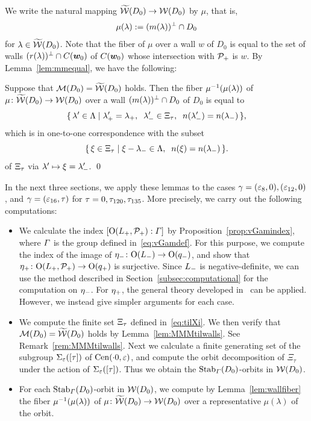 \documentclass{amsart} %
\begin{document}
%
We write the natural mapping
$\widetilde{\mathord{\mathcal{W}}}(D_0)\to \mathord{\mathcal{W}}(D_0)$
by $\mu$, that is, 
\[
\mu(\lambda):=(m(\lambda))^{\perp}\cap D_0
\]
for $\lambda\in \widetilde{\mathord{\mathcal{W}}}(D_0)$.
Note that the fiber of $\mu$ over a wall $w$
of $D_0$ is equal to the set of walls $(r(\lambda))^{\perp}\cap \mathord{C}(\boldsymbol{w}_0)$
of $\mathord{C}(\boldsymbol{w}_0)$ whose intersection with $\mathord{\mathcal{P}}_{+}$ is $w$.
By Lemma~\ref{lem:mmequal}, we have the following:
%
\begin{lemma}\label{lem:wallfiber}
Suppose that $\mathord{\mathcal{M}}(D_0)=\widetilde{\mathord{\mathcal{W}}} (D_0)$ holds.
Then the fiber $\mu^{-1}(\mu(\lambda))$ 
of 
$\mu\colon \widetilde{\mathord{\mathcal{W}}}(D_0)\to \mathord{\mathcal{W}}(D_0)$
over a wall $(m(\lambda))^{\perp}\cap D_0$ of $D_0$
is equal to
\[
\set{\lambda\sprime\in \Leech}%
{\lambdaplus\sprime=\lambdaplus, \;\; \lambdaminus\sprime\in \Xitau, \;\; n(\lambdaminus\sprime)=n(\lambdaminus)},
\]
which is in one-to-one correspondence with the subset 
\[
\{\,{\xi\in \Xi_{\tau}}\mid {\xi-{\lambda}_{-}\in \Lambda, \;\; n(\xi)=n({\lambda}_{-})} \,\}.
\]
of $\Xi_{\tau}$ via $\lambda^{\prime} \mapsto \xi={\lambda}_{-}^{\prime}$.
\qed
\end{lemma}
%
In the next three sections, we apply these lemmas to the cases $\gamma=(\varepsilon_8, 0), (\varepsilon_{12}, 0)$,
and $\gamma=(\varepsilon_{16}, \tau)$ for $\tau=0,\tau_{120},\tau_{135}$.
More precisely,
we carry out the following computations:
%
\begin{itemize}
\item 
We calculate the index $[\mathord{\mathrm{O}}(L_{+}, \mathord{\mathcal{P}}_{+}): \varGamma]$ 
by Proposition~\ref{prop:vGamindex},
where $\varGamma$ is the group defined in~\eqref{eq:vGamdef}.
 For this purpose, 
we compute the index of 
the image of ${\eta}_{-}\colon \mathord{\mathrm{O}}(L_{-})\to \mathord{\mathrm{O}}(q_{-})$, and 
show that 
${\eta}_{+}\colon \mathord{\mathrm{O}}(L_{+}, \mathord{\mathcal{P}}_{+})\to \mathord{\mathrm{O}}(q_{+})$
is surjective.
Since $L_{-}$ is negative-definite,
we can use the method described in Section~\ref{subsec:computational}
for the computation on ${\eta}_{-}$.
For ${\eta}_{+}$, 
the general theory developed in~\cite[Chapter VIII]{MirandaMorrison2009} can be applied.
However,  we instead give simpler arguments for each case.
\item 
We compute the finite set $\Xi_{\tau}$
defined in~\eqref{eq:tilXi}.
%
%
We then verify that $\mathord{\mathcal{M}}(D_0)=\widetilde{\mathord{\mathcal{W}}} (D_0)$ holds
by Lemma~\ref{lem:MMMtilwalls}.
See Remark~\ref{rem:MMMtilwalls}.
Next we 
calculate a finite generating set of 
the subgroup $\Sigma_{\varepsilon}([\tau])$ of $\mathrm{Cen}(\cdot 0, \varepsilon)$,
and 
compute the orbit decomposition of $\Xi_{\tau}$ under the action of $\Sigma_{\varepsilon}([\tau])$.
Thus we obtain 
the $\operatorname{Stab}_{\varGamma}(D_0)$-orbits in $\mathord{\mathcal{W}}(D_0)$.
\item
For each $\operatorname{Stab}_{\varGamma}(D_0)$-orbit in $\mathord{\mathcal{W}}(D_0)$,
we compute by Lemma~\ref{lem:wallfiber} the fiber $\mu^{-1}(\mu(\lambda))$ of $\mu\colon \widetilde{\mathord{\mathcal{W}}}(D_0)\to \mathord{\mathcal{W}}(D_0)$
over a representative $\mu(\lambda)$ of the orbit.
\end{itemize}
\end{document}
